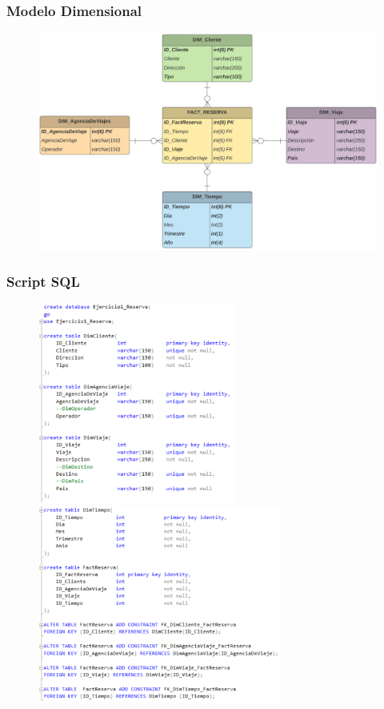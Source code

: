 \documentclass[12pt,letterpaper]{article}
\begin{document}
\newpage

\subsubsection{\textbf{Modelo Dimensional }}

	\begin{figure}[htb]
		\begin{center}
			\includegraphics[width=14cm]{./Imagenes/mod_dimensional_2}
			
		\end{center}
	\end{figure}

\subsubsection{\textbf{Script SQL }}

	\begin{figure}[htb]
		\begin{center}
			\includegraphics[width=6.5cm]{./Imagenes/Ejercicio2_script1}
			\includegraphics[width=8cm]{./Imagenes/Ejercicio2_script2}
		\end{center}
	\end{figure}
\end{document}

